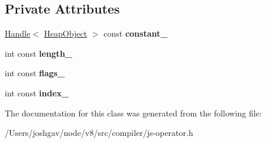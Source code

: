 \subsection*{Private Attributes}
\begin{DoxyCompactItemize}
\item 
\hyperlink{classv8_1_1internal_1_1_handle}{Handle}$<$ \hyperlink{classv8_1_1internal_1_1_heap_object}{Heap\+Object} $>$ const {\bfseries constant\+\_\+}\hypertarget{classv8_1_1internal_1_1compiler_1_1_create_literal_parameters_aafd9d549e763efa6e0e6199444c56538}{}\label{classv8_1_1internal_1_1compiler_1_1_create_literal_parameters_aafd9d549e763efa6e0e6199444c56538}

\item 
int const {\bfseries length\+\_\+}\hypertarget{classv8_1_1internal_1_1compiler_1_1_create_literal_parameters_a6b138504544e7fb9e1ab00e0bc06202f}{}\label{classv8_1_1internal_1_1compiler_1_1_create_literal_parameters_a6b138504544e7fb9e1ab00e0bc06202f}

\item 
int const {\bfseries flags\+\_\+}\hypertarget{classv8_1_1internal_1_1compiler_1_1_create_literal_parameters_a72510f8752c33338ac0b6de45cf6d0a9}{}\label{classv8_1_1internal_1_1compiler_1_1_create_literal_parameters_a72510f8752c33338ac0b6de45cf6d0a9}

\item 
int const {\bfseries index\+\_\+}\hypertarget{classv8_1_1internal_1_1compiler_1_1_create_literal_parameters_acca1e389f1b94759fd83b5e3d187757c}{}\label{classv8_1_1internal_1_1compiler_1_1_create_literal_parameters_acca1e389f1b94759fd83b5e3d187757c}

\end{DoxyCompactItemize}


The documentation for this class was generated from the following file\+:\begin{DoxyCompactItemize}
\item 
/\+Users/joshgav/node/v8/src/compiler/js-\/operator.\+h\end{DoxyCompactItemize}
